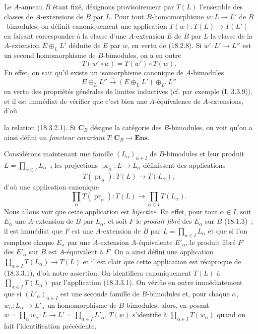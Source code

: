 \begin{env}[18.3.2]
\label{0.18.3.2-fr}
Le $A$-anneau $B$ étant fixé, désignons provisoirement par $T(L)$ l'ensemble
des classes de $A$-extensions de $B$ par $L$. Pour tout $B$-homomorphisme
$w:L\to L'$ de $B$-bimodules, on définit canoniquement une application
$T(w):T(L)\to T(L')$ en faisant correspondre à la classe d'une $A$-extension
$E$ de $B$ par $L$ la classe de la $A$-extension $E\oplus_LL'$ déduite de $E$
par $w$, en vertu de (18.2.8). Si $w':L'\to L''$ est un second homomorphisme
de $B$-bimodules, on a en outre
\begin{equation}
\label{0.18.3.2.1-fr}
\tag{18.3.2.1}
  T(w'\circ w)=T(w')\circ T(w).
\end{equation}
En effet, on sait qu'il existe un isomorphisme canonique de $A$-bimodules
\[
  E\oplus_LL''\xrightarrow{\sim}(E\oplus_LL')\oplus_{L'}L''
\]
en vertu des propriétés générales de limites inductives (cf. par exemple
($\mathrm{I}$, 3.3.9)), et il est immédiat de vérifier que c'est bien une
$A$-équivalence de $A$-extensions, d'où


la relation (18.3.2.1). Si $\mathbf C_B$ désigne la catégorie des
$B$-bimodules, on voit qu'on a ainsi défini un \emph{foncteur covariant}
$T:\mathbf C_B\to\mathbf{Ens}$.
\end{env}

\begin{env}[18.3.3]
\label{0.18.3.3-fr}
Considérons maintenant une famille $(L_\alpha)_{\alpha\in I}$ de
$B$-bimodules et leur produit $L=\prod_{\alpha\in I}L_\alpha$~; les
projections $\operatorname{pr}_\alpha:L\to L_\alpha$ définissent des
applications
\[
  T(\operatorname{pr}_\alpha):T(L)\to T(L_\alpha),
\]
d'où une application canonique
\begin{equation}
\label{0.18.3.3.1-fr}
\tag{18.3.3.1}
  \prod_\alpha T(\operatorname{pr}_\alpha):T(L)
  \longrightarrow\prod_{\alpha\in I}T(L_\alpha).
\end{equation}
Nous allons voir que cette application est \emph{bijective}. En effet, pour
tout $\alpha\in I$, soit $E_\alpha$ une $A$-extension de $B$ par $L_\alpha$,
et soit $F$ le \emph{produit fibré} des $E_\alpha$ sur $B$ (18.1.3)~; il est
immédiat que $F$ est une $A$-extension de $B$ par
$L=\prod_{\alpha\in I}L_\alpha$ et que si l'on remplace chaque $E_\alpha$ par
une $A$-extension $A$-équivalente $E'_\alpha$, le produit fibré $F'$ des
$E'_\alpha$ sur $B$ est $A$-équivalent à $F$. On a ainsi défini une
application $\prod_{\alpha\in I}T(L_\alpha)\to T(L)$ et il est clair que cette
application est réciproque de (18.3.3.1), d'où notre assertion. On identifiera
canoniquement $T(L)$ à $\prod_{\alpha\in I}T(L_\alpha)$ par l'application
(18.3.3.1). On vérifie en outre immédiatement que si
$(L'_\alpha)_{\alpha\in I}$ est une seconde famille de $B$-bimodules et, pour
chaque $\alpha$, $w_\alpha:L_\alpha\to L'_\alpha$ un homomorphisme de
$B$-bimodules, alors, en posant
$w=\prod_\alpha w_\alpha:L\to L'=\prod_{\alpha\in I}L'_\alpha$, $T(w)$
s'identifie à $\prod_{\alpha\in I}T(w_\alpha)$ quand on fait l'identification
précédente.
\end{env}

